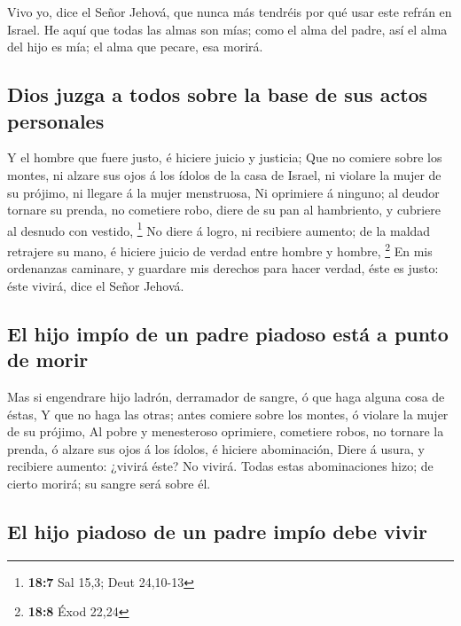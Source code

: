  Vivo yo, dice el Señor Jehová, que nunca más tendréis por
qué usar este refrán en Israel.  He aquí que todas las almas
son mías; como el alma del padre, así el alma del hijo es mía; el alma
que pecare, esa morirá.

\hypertarget{dios-juzga-a-todos-sobre-la-base-de-sus-actos-personales}{%
\subsection{Dios juzga a todos sobre la base de sus actos
personales}\label{dios-juzga-a-todos-sobre-la-base-de-sus-actos-personales}}

 Y el hombre que fuere justo, é hiciere juicio y justicia;
 Que no comiere sobre los montes, ni alzare sus ojos á los
ídolos de la casa de Israel, ni violare la mujer de su prójimo, ni
llegare á la mujer menstruosa,  Ni oprimiere á ninguno; al
deudor tornare su prenda, no cometiere robo, diere de su pan al
hambriento, y cubriere al desnudo con vestido, \footnote{\textbf{18:7}
  Sal 15,3; Deut 24,10-13}  No diere á logro, ni recibiere
aumento; de la maldad retrajere su mano, é hiciere juicio de verdad
entre hombre y hombre, \footnote{\textbf{18:8} Éxod 22,24} 
En mis ordenanzas caminare, y guardare mis derechos para hacer verdad,
éste es justo: éste vivirá, dice el Señor Jehová.

\hypertarget{el-hijo-impuxedo-de-un-padre-piadoso-estuxe1-a-punto-de-morir}{%
\subsection{El hijo impío de un padre piadoso está a punto de
morir}\label{el-hijo-impuxedo-de-un-padre-piadoso-estuxe1-a-punto-de-morir}}

 Mas si engendrare hijo ladrón, derramador de sangre, ó que
haga alguna cosa de éstas,  Y que no haga las otras; antes
comiere sobre los montes, ó violare la mujer de su prójimo,
 Al pobre y menesteroso oprimiere, cometiere robos, no
tornare la prenda, ó alzare sus ojos á los ídolos, é hiciere
abominación,  Diere á usura, y recibiere aumento: ¿vivirá
éste? No vivirá. Todas estas abominaciones hizo; de cierto morirá; su
sangre será sobre él.

\hypertarget{el-hijo-piadoso-de-un-padre-impuxedo-debe-vivir}{%
\subsection{El hijo piadoso de un padre impío debe
vivir}\label{el-hijo-piadoso-de-un-padre-impuxedo-debe-vivir}}

